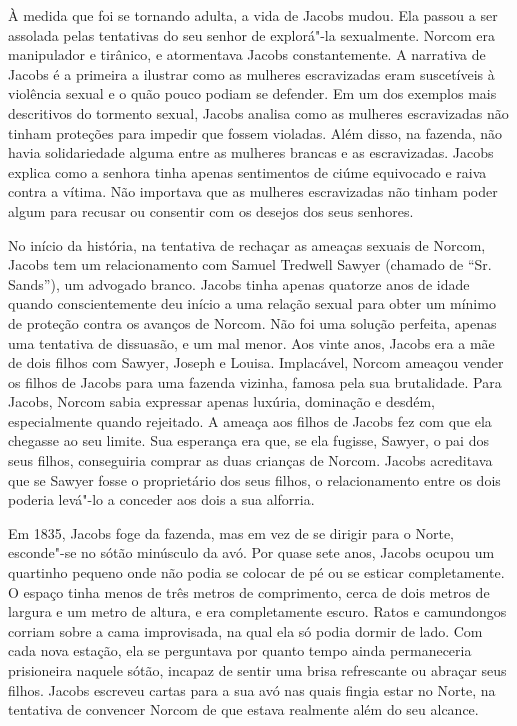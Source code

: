 À medida que foi se tornando adulta, a vida de Jacobs mudou. Ela passou
a ser assolada pelas tentativas do seu senhor de explorá"-la sexualmente.
Norcom era manipulador e tirânico, e atormentava Jacobs constantemente.
A narrativa de Jacobs é a primeira a ilustrar como as mulheres
escravizadas eram suscetíveis à violência sexual e o quão pouco podiam
se defender. Em um dos exemplos mais descritivos do tormento sexual,
Jacobs analisa como as mulheres escravizadas não tinham proteções para
impedir que fossem violadas. Além disso, na fazenda, não havia
solidariedade alguma entre as mulheres brancas e as escravizadas. Jacobs
explica como a senhora tinha apenas sentimentos de ciúme equivocado e
raiva contra a vítima. Não importava que as mulheres escravizadas não
tinham poder algum para recusar ou consentir com os desejos dos seus
senhores.

No início da história, na tentativa de rechaçar as ameaças sexuais de
Norcom, Jacobs tem um relacionamento com Samuel Tredwell Sawyer (chamado
de ``Sr. Sands''), um advogado branco. Jacobs tinha apenas quatorze anos
de idade quando conscientemente deu início a uma relação sexual para
obter um mínimo de proteção contra os avanços de Norcom. Não foi uma
solução perfeita, apenas uma tentativa de dissuasão, e um mal menor. Aos
vinte anos, Jacobs era a mãe de dois filhos com Sawyer, Joseph e Louisa.
Implacável, Norcom ameaçou vender os filhos de Jacobs para uma fazenda
vizinha, famosa pela sua brutalidade. Para Jacobs, Norcom sabia
expressar apenas luxúria, dominação e desdém, especialmente quando
rejeitado. A ameaça aos filhos de Jacobs fez com que ela chegasse ao seu limite.
Sua esperança era que, se ela fugisse, Sawyer, o pai dos seus filhos,
conseguiria comprar as duas crianças de Norcom. Jacobs acreditava que se
Sawyer fosse o proprietário dos seus filhos, o relacionamento entre os
dois poderia levá"-lo a conceder aos dois a sua alforria.

Em 1835, Jacobs foge da fazenda, mas em vez de se dirigir para o Norte,
esconde"-se no sótão minúsculo da avó. Por quase sete anos, Jacobs ocupou
um quartinho pequeno onde não podia se colocar de pé ou se esticar
completamente. O espaço tinha menos de três metros de comprimento, cerca
de dois metros de largura e um metro de altura, e era completamente
escuro. Ratos e camundongos corriam sobre a cama improvisada, na qual
ela só podia dormir de lado. Com cada nova estação, ela se perguntava
por quanto tempo ainda permaneceria prisioneira naquele sótão, incapaz
de sentir uma brisa refrescante ou abraçar seus filhos. Jacobs escreveu
cartas para a sua avó nas quais fingia estar no Norte, na tentativa de
convencer Norcom de que estava realmente além do seu alcance.

